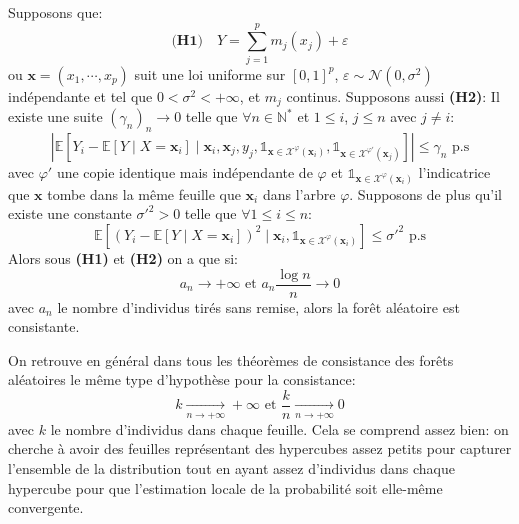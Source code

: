 \begin{theoreme}
    Supposons que:
    \begin{equation*}
        \textbf{(H1)} \quad Y = \sum_{j=1}^p m_j ( x_j ) + \varepsilon
    \end{equation*}
    ou $\mathbf{x} = (x_1, \cdots ,x_p)$ suit une loi uniforme sur $[0, 1]^p$, $\varepsilon \sim \mathcal{N} (0,\sigma^2)$ indépendante et tel que $0 < \sigma^2 < +\infty$, et $m_j$ continus.
    Supposons aussi \textbf{(H2)}:
    Il existe une suite $(\gamma_n)_n \to 0$ telle que $\forall n \in \mathbb{N}^*$ et $1 \leq i$, $j \leq n$ avec $j \neq i$:
    \begin{equation*}
        \left\vert \mathbb{E} \left[ Y_i - \mathbb{E} \left[ Y \mid X = \mathbf{x}_i \right] \mid \mathbf{x}_i,\mathbf{x}_j,y_j,\mathds{1}_{\mathbf{x} \in \mathcal{X}^\varphi (\mathbf{x}_i)},\mathds{1}_{\mathbf{x} \in \mathcal{X}^{\varphi'} (\mathbf{x}_j)} \right]  \right\vert \leq \gamma_n \text{ p.s}
    \end{equation*}
    avec $\varphi'$ une copie identique mais indépendante de $\varphi$ et $\mathds{1}_{\mathbf{x} \in \mathcal{X}^{\varphi} (\mathbf{x}_i)}$ l'indicatrice que $\mathbf{x}$ tombe dans la même feuille que $\mathbf{x}_i$ dans l'arbre $\varphi$.
    Supposons de plus qu'il existe une constante $\sigma'^2 > 0$ telle que $\forall 1 \leq i \leq n$: 
    \begin{equation*}
        \mathbb{E} \left[ \left( Y_i - \mathbb{E} \left[ Y \mid X = \mathbf{x}_i \right] \right)^2 \mid \mathbf{x}_i , \mathds{1}_{\mathbf{x} \in \mathcal{X}^\varphi (\mathbf{x}_i)} \right] \leq \sigma'^2 \text{ p.s}
    \end{equation*}
    Alors sous \textbf{(H1)} et \textbf{(H2)} on a que si:
    \begin{equation*}
        a_n \to +\infty \text{ et } a_n \frac{\log n}{n} \to 0
    \end{equation*}
    avec $a_n$ le nombre d'individus tirés sans remise, alors la forêt aléatoire est consistante.
\end{theoreme}

On retrouve en général dans tous les théorèmes de consistance des forêts aléatoires le même type d'hypothèse pour la consistance:
\begin{equation*}
    k \xrightarrow[n \to +\infty]{} +\infty \text{ et } \frac{k}{n} \xrightarrow[n \to +\infty]{} 0
\end{equation*}
avec $k$ le nombre d'individus dans chaque feuille. Cela se comprend assez bien: on cherche à avoir des feuilles représentant des hypercubes assez petits pour capturer l'ensemble de la distribution tout en ayant assez d'individus dans chaque hypercube pour que l'estimation locale de la probabilité soit elle-même convergente.

